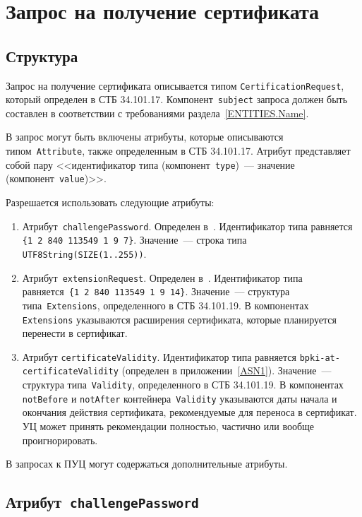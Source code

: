 \section{Запрос на получение сертификата}\label{FMT.CSR}

\subsection{Структура}\label{FMT.CSR.Structure}

Запрос на получение сертификата описывается типом 
\texttt{CertificationRequest}, который определен в СТБ 34.101.17. 
%
Компонент~\texttt{subject} запроса должен быть составлен в соответствии
с требованиями раздела~\ref{ENTITIES.Name}.

В запрос могут быть включены атрибуты, которые описываются 
типом~\texttt{Attribute}, также определенным в СТБ 34.101.17. 
Атрибут представляет собой пару <<идентификатор типа 
(компонент~\texttt{type})~--- значение (компонент~\texttt{value})>>.

Разрешается использовать следующие атрибуты:
\begin{enumerate}
\item
Атрибут~\texttt{challengePassword}. Определен в~\cite{PKCS9}.
%
Идентификатор типа равняется \verb|{1 2 840 113549 1 9 7}|.
Значение~--- строка типа \verb|UTF8String(SIZE(1..255))|.

\item
Атрибут~\texttt{extensionRequest}. Определен в~\cite{PKCS9}.
%
Идентификатор типа равняется~\verb|{1 2 840 113549 1 9 14}|.
Значение~--- структура типа~\verb|Extensions|, определенного в СТБ 34.101.19.
В компонентах \verb|Extensions| указываются расширения сертификата,
которые планируется перенести в сертификат.

\item
Атрибут \texttt{certificateValidity}.
Идентификатор типа равняется \verb|bpki-at-certificateValidity|
(определен в приложении~\ref{ASN1}). Значение~--- структура 
типа~\verb|Validity|, определенного в СТБ 34.101.19. 
%
В компонентах \texttt{notBefore} и \texttt{notAfter} контейнера~\verb|Validity| 
указываются даты начала и окончания действия сертификата,
рекомендуемые для переноса в сертификат.
%
УЦ может принять рекомендации полностью, частично или вообще проигнорировать. 
\end{enumerate}

В запросах к ПУЦ могут содержаться дополнительные атрибуты.

\subsection{Атрибут~\texttt{challengePassword}}\label{FMT.CSR.CP}


